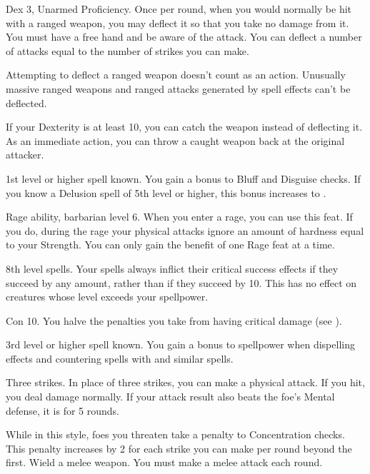 \featpres Dex 3, Unarmed Proficiency.
\featben Once per round, when you would normally be hit with a ranged weapon, you may deflect it so that you take no damage from it.
You must have a free hand and be aware of the attack.
You can deflect a number of attacks equal to the number of strikes you can make.
\par Attempting to deflect a ranged weapon doesn't count as an action.
Unusually massive ranged weapons and ranged attacks generated by spell effects can't be deflected.
\par If your Dexterity is at least 10, you can catch the weapon instead of deflecting it.
As an immediate action, you can throw a caught weapon back at the original attacker.

\featpre 1st level or higher  spell known.
\featben You gain a  bonus to Bluff and Disguise checks.
If you know a Delusion spell of 5th level or higher, this bonus increases to .

\featpre Rage ability, barbarian level 6.
\featben When you enter a rage, you can use this feat. If you do, during the rage your physical attacks ignore an amount of hardness equal to your Strength.
 You can only gain the benefit of one Rage feat at a time.

\featpre 8th level spells.
\featben Your spells always inflict their critical success effects if they succeed by any amount, rather than if they succeed by 10.
This has no effect on creatures whose level exceeds your spellpower.

\featpre Con 10.
\featben You halve the penalties you take from having critical damage (see ).

\featpre 3rd level or higher  spell known.
\featben You gain a  bonus to spellpower when dispelling effects and countering spells with  and similar spells.

\featpre Three strikes.
\featben In place of three strikes, you can make a physical attack.
If you hit, you deal damage normally.
If your attack result also beats the foe's Mental defense, it is \disoriented for 5 rounds.

\featben While in this style, foes you threaten take a  penalty to Concentration checks.
This penalty increases by 2 for each strike you can make per round beyond the first.
\stylereq Wield a melee weapon. You must make a melee attack each round.

